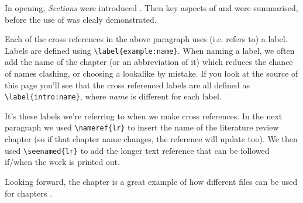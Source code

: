 In opening, \textit{Sections} were introduced .  Then key aspects of   and   were summarised, before the use of   was clealy demonstrated.  

Each of the cross references in the above paragraph uses (i.e. refers to) a label.  Labels are defined using \verb|\label{example:name}|.  When naming a label, we often add the name of the chapter (or an abbreviation of it) which reduces the chance of names clashing, or choosing a lookalike by mistake.  If you look at the source of this page you'll see that the cross referenced labels are all defined as \verb|\label{intro:name}|, where \textit{name} is different for each label.

It's these labels we're referring to when we make cross references.  In the next paragraph we used \verb|\nameref{lr}| to insert the name of the literature review chapter (so if that chapter name changes, the reference will update too).  We then used \verb|\seenamed{lr}| to add the longer text reference that can be followed if/when the work is printed out.

Looking forward, the  chapter is a great example of how different files can be used for chapters .
